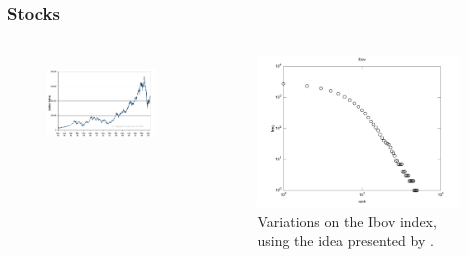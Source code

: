 \documentclass[notes]{beamer}
\begin{document}
\frame
{
  \frametitle{Stocks}

  \begin{columns}[c]
     \begin{figure}[h!]
     \centering
     \includegraphics[width=\textwidth]{imagespresentation/bovespa.png}
     \label{fig:bovespa}
     \end{figure}
     \begin{figure}[h!]
     \centering
     \includegraphics[width=0.95\textwidth]{imagespresentation/ibov.pdf}
     \caption{Variations on the Ibov index, using the idea presented by \cite{mandelbrot1963}.}
     \label{fig:glaeserzipf}
     \end{figure}
  \end{columns}
}
\end{document}
